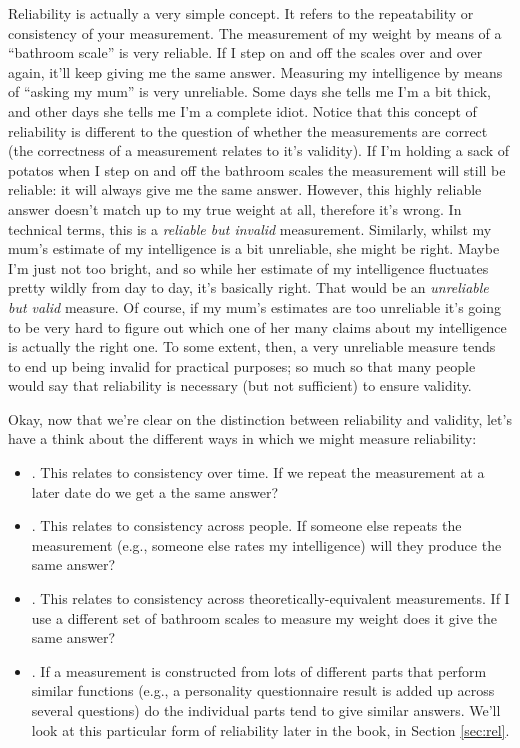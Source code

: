 Reliability is actually a very simple concept. It refers to the repeatability or consistency of your measurement. The measurement of my weight by means of a ``bathroom scale'' is very reliable. If I step on and off the scales over and over again, it'll keep giving me the same answer. Measuring my intelligence by means of ``asking my mum'' is very unreliable. Some days she tells me I'm a bit thick, and other days she tells me I'm a complete idiot. Notice that this concept of reliability is different to the question of whether the measurements are correct (the correctness of a measurement relates to it's validity). If I'm holding a sack of potatos when I step on and off the bathroom scales the measurement will still be reliable: it will always give me the same answer. However, this highly reliable answer doesn't match up to my true weight at all, therefore it's wrong. In technical terms, this is a {\it reliable but invalid} measurement. Similarly, whilst my mum's estimate of my intelligence is a bit unreliable, she might be right. Maybe I'm just not too bright, and so while her estimate of my intelligence fluctuates pretty wildly from day to day, it's basically right. That would be an {\it unreliable but valid} measure. Of course, if my mum's estimates are too unreliable it's going to be very hard to figure out which one of her many claims about my intelligence is actually the right one. To some extent, then, a very unreliable measure tends to end up being invalid for practical purposes; so much so that many people would say that reliability is necessary (but not sufficient) to ensure validity. 

Okay, now that we're clear on the distinction between reliability and validity, let's have a think about the different ways in which we might measure reliability:

\begin{itemize}
\item {}. This relates to consistency over time. If we repeat the measurement at a later date do we get a the same answer?
\item {}. This relates to consistency across people. If someone else repeats the measurement (e.g., someone else rates my intelligence) will they produce the same answer?
\item {}. This relates to consistency across theoretically-equivalent measurements. If I use a different set of bathroom scales to measure my weight does it give the same answer?
\item {}. If a measurement is constructed from lots of different parts that perform similar functions (e.g., a personality questionnaire result is added up across several questions) do the individual parts tend to give similar answers. We'll look at this particular form of reliability later in the book, in Section \ref{sec:rel}.
\end{itemize}

